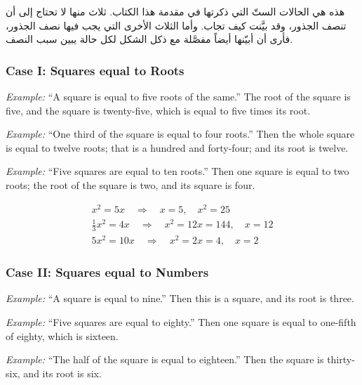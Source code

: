 \documentclass[11pt,a4paper,openany,oneside]{book}
\begin{document}
\begin{arabicbox}
\begin{Arabic}
هذه هي الحالات الستّ التي ذكرتها في مقدمة هذا الكتاب. ثلاث
منها لا تحتاج إلى أن تنصف الجذور، وقد بيَّنت كيف تجاب. وأما
الثلاث الأخرى التي يجب فيها نصف الجذور، فأرى أن أبيّنها
أيضاً مفصَّلة مع ذكل الشكل لكل حالة يبين سبب النصف.
\end{Arabic}
\end{arabicbox}

\subsubsection*{Case I: Squares equal to Roots}

\textit{Example:} ``A square is equal to five roots of the same.'' The root of
the square is five, and the square is twenty-five, which is equal to five times
its root.

\textit{Example:} ``One third of the square is equal to four roots.'' Then the
whole square is equal to twelve roots; that is a hundred and forty-four; and
its root is twelve.

\textit{Example:} ``Five squares are equal to ten roots.'' Then one square is
equal to two roots; the root of the square is two, and its square is four.

\begin{equation}
\begin{gathered}
\boxed{x^2 = 5x \quad\Rightarrow\quad x = 5,\quad x^2 = 25}\\[0.35em]
\boxed{\tfrac{1}{3}x^2 = 4x \quad\Rightarrow\quad x^2 = 12x = 144,\quad x = 12}\\[0.35em]
\boxed{5x^2 = 10x \quad\Rightarrow\quad x^2 = 2x = 4,\quad x = 2}
\end{gathered}
\end{equation}

\subsubsection*{Case II: Squares equal to Numbers}

\textit{Example:} ``A square is equal to nine.'' Then this is a square, and its
root is three.

\textit{Example:} ``Five squares are equal to eighty.'' Then one square is equal
to one-fifth of eighty, which is sixteen.

\textit{Example:} ``The half of the square is equal to eighteen.'' Then the
square is thirty-six, and its root is six.
\end{document}
